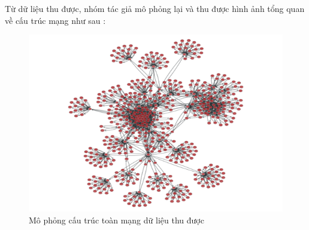 \begin {itemize}
	 	Từ dữ liệu thu được, nhóm tác giả mô phỏng lại và thu được hình ảnh tổng quan về cấu trúc mạng như sau :
	 
	 	\begin{center}
	 		\begin{figure}[htp]
	 			\begin{center}
	 				\includegraphics [scale=.5]{picture/Hinh3_2}
	 			\end{center}
	 			\caption{Mô phỏng cấu trúc toàn mạng dữ liệu thu được}
	 			\label{refhinh3_2}
	 		\end{figure}
	 	\end{center}
 	\end {itemize}
 	
